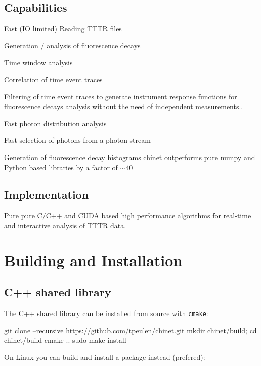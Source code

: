 \subsection*{Capabilities}


\begin{DoxyItemize}
\item Fast (IO limited) Reading T\+T\+TR files
\item Generation / analysis of fluorescence decays
\item Time window analysis
\item Correlation of time event traces
\item Filtering of time event traces to generate instrument response functions for fluorescence decays analysis without the need of independent measurements..
\item Fast photon distribution analysis
\item Fast selection of photons from a photon stream
\end{DoxyItemize}

Generation of fluorescence decay histograms chinet outperforms pure numpy and Python based libraries by a factor of $\sim$40

\subsection*{Implementation}

Pure pure C/\+C++ and C\+U\+DA based high performance algorithms for real-\/time and interactive analysis of T\+T\+TR data.

\section*{Building and Installation}

\subsection*{C++ shared library}

The C++ shared library can be installed from source with \href{https://cmake.org/}{\tt cmake}\+:


\begin{DoxyCode}
git clone --recursive https://github.com/tpeulen/chinet.git
mkdir chinet/build; cd chinet/build
cmake ..
sudo make install
\end{DoxyCode}


On Linux you can build and install a package instead (prefered)\+:

